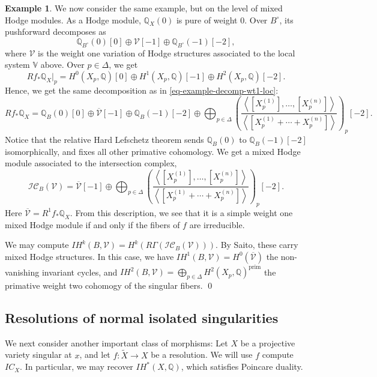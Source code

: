 \documentclass[12pt]{amsart}
\newcommand{\Q}{\mathbb{Q}}
\newcommand{\ol}{\overline}
\newcommand{\wt}{\widetilde}
\theoremstyle{definition}
\newtheorem{example}[theorem]{Example}
\theoremstyle{remark}
\numberwithin{equation}{section}
\begin{document}
\begin{example}
We now consider the same example, but on the level of mixed Hodge modules. As a Hodge
module, \(\Q_X(0)\) is pure of weight 0. Over \(B^\circ\), its pushforward 
decomposes as 
\begin{equation}
    \Q_{B^\circ}(0)[0] \oplus \mathcal{V}[-1] \oplus \Q_{B^\circ}(-1)[-2],
\end{equation}
where \(\mathcal{V}\) is the weight one variation of Hodge structures associated to the 
local system \(\mathbb{V}\) above. Over \(p \in \Delta\), we get 
\begin{equation}
    Rf_* \Q_X|_p = H^0(X_p, \Q)[0] \oplus H^1(X_p, \Q)[-1] \oplus H^2(X_p, \Q)[-2].
\end{equation}
Hence, we get the same decomposition as in \eqref{eq-example-decomp-wt1-loc}: 
\begin{equation}
   Rf_* \Q_X = \Q_B(0)[0] \oplus \ol{\mathcal{V}}[-1] \oplus \Q_B(-1)[-2] \oplus
   \bigoplus_{p \in \Delta} \left(\frac{\left<[X_p^{(1)}], \dots, [X_p^{(n)}]\right>}
   {\left<[X_p^{(1)} + \cdots + X_p^{(n)}]\right>}\right)_p[-2].
\end{equation}
Notice that the relative Hard Lefschetz theorem sends \(\Q_B(0)\) to \(\Q_B(-1)[-2]\)
isomorphically, and fixes all other primative cohomology. We get a mixed Hodge module 
associated to the intersection complex, 
\begin{equation}
    \mathscr{IC}_B(\mathcal{V}) = \ol{\mathcal{V}}[-1] \oplus 
    \bigoplus_{p \in \Delta} \left(\frac{\left<[X_p^{(1)}], \dots, [X_p^{(n)}]\right>}
   {\left<[X_p^{(1)} + \cdots + X_p^{(n)}]\right>}\right)_p[-2].
\end{equation}
Here \(\ol{\mathcal{V}} = R^1 f_* \Q_X\). From this description, we see that it is a
simple weight one mixed Hodge module if and only if the fibers of \(f\) are irreducible.

We may compute \(IH^k(B, \mathcal{V}) = H^k(R \Gamma(\mathscr{IC}_B(\mathcal{V})))\).
By Saito, these carry mixed Hodge structures. In this case, we have 
\(IH^1(B, \mathcal{V}) = H^0(\ol{\mathcal{V}})\) the non-vanishing invariant cycles, and
\(IH^2(B, \mathcal{V}) = \bigoplus_{p \in \Delta} H^2(X_p, \Q)^{\mathrm{prim}}\)
the primative weight two cohomogy of the singular fibers.
\qed
\end{example}




\subsection{Resolutions of normal isolated singularities}
We next consider another important class of morphisms: Let \(X\) be a projective 
variety singular at \(x\), and let \(f: \wt{X} \to X\) be a resolution. We will 
use \(f\) compute \(IC_X\). In particular, we may recover \(IH^*(X, \Q)\), which 
satisfies Poincare duality.
\end{document}
